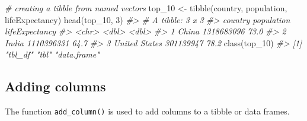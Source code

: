 \documentclass[
]{book}
\newenvironment{Shaded}{\begin{snugshade}}{\end{snugshade}}
\newcommand{\CommentTok}[1]{\textcolor[rgb]{0.56,0.35,0.01}{\textit{#1}}}
\newcommand{\DecValTok}[1]{\textcolor[rgb]{0.00,0.00,0.81}{#1}}
\newcommand{\FunctionTok}[1]{\textcolor[rgb]{0.00,0.00,0.00}{#1}}
\newcommand{\NormalTok}[1]{#1}
\newcommand{\OtherTok}[1]{\textcolor[rgb]{0.56,0.35,0.01}{#1}}
\begin{document}
\begin{Shaded}
\begin{Highlighting}[]
\CommentTok{\# creating a tibble from named vectors}
\NormalTok{top\_10 }\OtherTok{\textless{}{-}} \FunctionTok{tibble}\NormalTok{(country, population, lifeExpectancy)}
\FunctionTok{head}\NormalTok{(top\_10, }\DecValTok{3}\NormalTok{)}
\CommentTok{\#\textgreater{} \# A tibble: 3 x 3}
\CommentTok{\#\textgreater{}   country       population lifeExpectancy}
\CommentTok{\#\textgreater{}   \textless{}chr\textgreater{}              \textless{}dbl\textgreater{}          \textless{}dbl\textgreater{}}
\CommentTok{\#\textgreater{} 1 China         1318683096           73.0}
\CommentTok{\#\textgreater{} 2 India         1110396331           64.7}
\CommentTok{\#\textgreater{} 3 United States  301139947           78.2}
\FunctionTok{class}\NormalTok{(top\_10)}
\CommentTok{\#\textgreater{} [1] "tbl\_df"     "tbl"        "data.frame"}
\end{Highlighting}
\end{Shaded}

\hypertarget{adding-columns}{%
\subsection{Adding columns}\label{adding-columns}}

The function \texttt{add\_column()} is used to add columns to a tibble or data frames.
\end{document}
